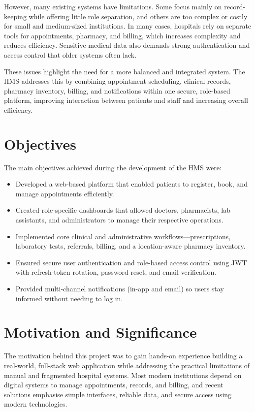 \documentclass[12pt,a4paper]{report}
\begin{document}
However, many existing systems have limitations. Some focus mainly on record-keeping
while offering little role separation, and others are too complex or costly for small
and medium-sized institutions. In many cases, hospitals rely on separate tools for
appointments, pharmacy, and billing, which increases complexity and reduces
efficiency. Sensitive medical data also demands strong authentication and access
control that older systems often lack.

These issues highlight the need for a more balanced and integrated system. The HMS
addresses this by combining appointment scheduling, clinical records, pharmacy
inventory, billing, and notifications within one secure, role-based platform,
improving interaction between patients and staff and increasing overall efficiency.

\section{Objectives}
The main objectives achieved during the development of the HMS were:
\begin{itemize}[leftmargin=1.4em]
  \item Developed a web-based platform that enabled patients to register, book, and
        manage appointments efficiently.
  \item Created role-specific dashboards that allowed doctors, pharmacists, lab
        assistants, and administrators to manage their respective operations.
  \item Implemented core clinical and administrative workflows---prescriptions,
        laboratory tests, referrals, billing, and a location-aware pharmacy inventory.
  \item Ensured secure user authentication and role-based access control using JWT
        with refresh-token rotation, password reset, and email verification.
  \item Provided multi-channel notifications (in-app and email) so users stay
        informed without needing to log in.
\end{itemize}

\section{Motivation and Significance}
The motivation behind this project was to gain hands-on experience building a
real-world, full-stack web application while addressing the practical limitations of
manual and fragmented hospital systems. Most modern institutions depend on digital
systems to manage appointments, records, and billing, and recent solutions emphasise
simple interfaces, reliable data, and secure access using modern technologies.
\end{document}
